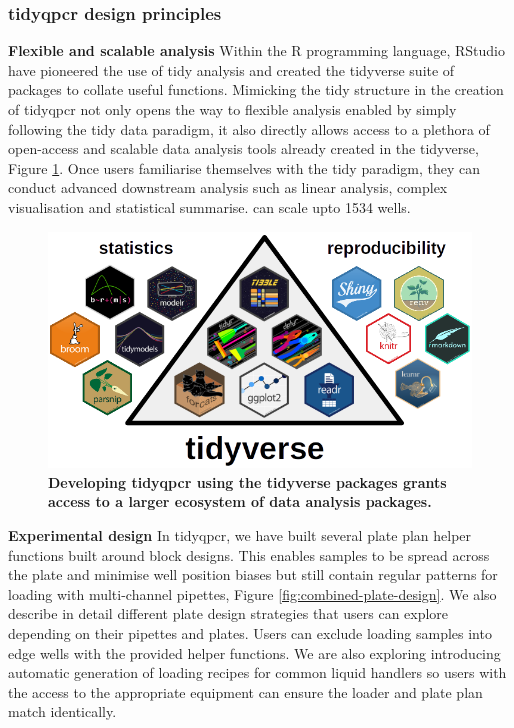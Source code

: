 \documentclass{SBCbookchapter}
\begin{document}
\subsubsection{tidyqpcr design principles}


\textbf{Flexible and scalable analysis} Within the R programming language, RStudio have pioneered the use of tidy analysis and created the tidyverse suite of packages to collate useful functions. Mimicking the tidy structure in the creation of tidyqpcr not only opens the way to flexible analysis enabled by simply following the tidy data paradigm, it also directly allows access to a plethora of open-access and scalable data analysis tools already created in the tidyverse, Figure \ref{fig:tidyverse-ecosystem}. Once users familiarise themselves with the tidy paradigm, they can conduct advanced downstream analysis such as linear analysis, complex visualisation and statistical summarise. can scale upto 1534 wells. 

\begin{figure}[t]

{\centering \includegraphics[width=0.8\linewidth]{figures/tidyverse_ecosystem} 

}

\caption{\textbf{Developing tidyqpcr using the tidyverse packages grants access to a larger ecosystem of data analysis packages.}}\label{fig:tidyverse-ecosystem}
\end{figure}

\textbf{Experimental design}  In tidyqpcr, we have built several plate plan helper functions built around block designs. This enables samples to be spread across the plate and minimise well position biases but still contain regular patterns for loading with multi-channel pipettes, Figure \ref{fig:combined-plate-design}. We also describe in detail different plate design strategies that users can explore depending on their pipettes and plates. Users can exclude loading samples into edge wells with the provided helper functions. We are also exploring introducing automatic generation of loading recipes for common liquid handlers so users with the access to the appropriate equipment can ensure the loader and plate plan match identically.
\end{document}
